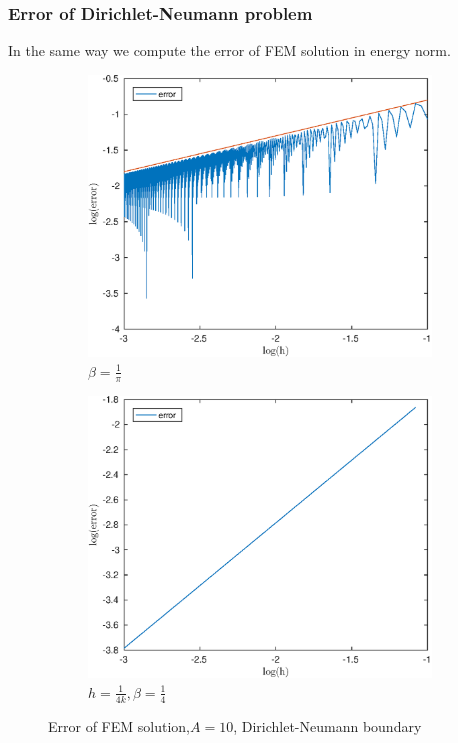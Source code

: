 \documentclass[12pt]{article}
\begin{document}
\subsubsection{Error of Dirichlet-Neumann problem}
In the same way we compute the error of FEM solution in energy norm.
\begin{figure}[h!]
\centering
\begin{subfigure}{0.4\textwidth}
\includegraphics[width=\textwidth]{error-pi-DN}
\caption{$\beta=\frac{1}{\pi}$}
\end{subfigure}
\hfill
\begin{subfigure}{0.4\textwidth}
\includegraphics[width=\textwidth]{error-4-DN}
\caption{$h=\frac{1}{4k},\beta=\frac{1}{4}$}
\end{subfigure}
\caption{Error of FEM solution,$A=10$, Dirichlet-Neumann boundary}
\end{figure}
\end{document}
